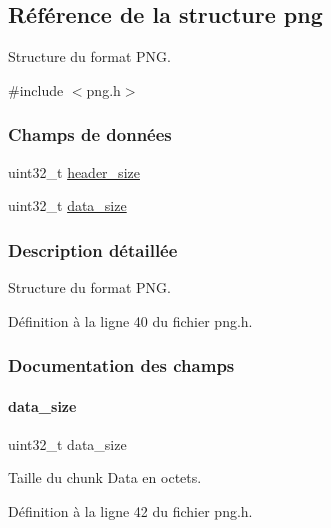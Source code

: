 \hypertarget{a00174}{}\subsection{Référence de la structure png}
\label{a00174}


Structure du format P\+NG.  




{\ttfamily \#include $<$png.\+h$>$}

\subsubsection*{Champs de données}
\begin{DoxyCompactItemize}
\item 
uint32\+\_\+t \hyperlink{a00174_a841923a20e6dda97c59351c8e97c9be6}{header\+\_\+size}
\item 
uint32\+\_\+t \hyperlink{a00174_ab670c6c21aced4765ecd6b29283f22b0}{data\+\_\+size}
\end{DoxyCompactItemize}


\subsubsection{Description détaillée}
Structure du format P\+NG. 

Définition à la ligne 40 du fichier png.\+h.



\subsubsection{Documentation des champs}
\mbox{\label{a00174_ab670c6c21aced4765ecd6b29283f22b0}} 
\paragraph{\texorpdfstring{data\+\_\+size}{data\_size}}
{\footnotesize\ttfamily uint32\+\_\+t data\+\_\+size}

Taille du chunk Data en octets. 

Définition à la ligne 42 du fichier png.\+h.

\mbox{\label{a00174_a841923a20e6dda97c59351c8e97c9be6}} 
